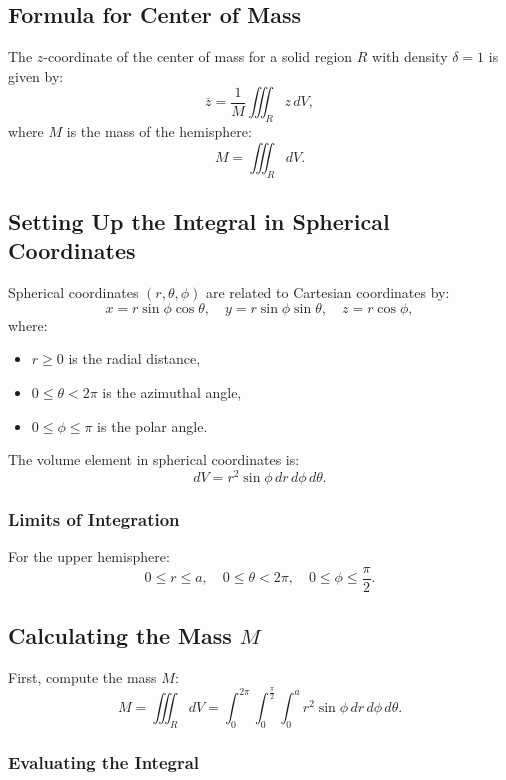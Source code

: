 \documentclass[11pt]{article}
\begin{document}
\newpage

\subsection{Formula for Center of Mass}

The \( z \)-coordinate of the center of mass for a solid region \( R \) with density \( \delta = 1 \) is given by:
\[
\overline{z} = \frac{1}{M} \iiint_{R} z \, dV,
\]
where \( M \) is the mass of the hemisphere:
\[
M = \iiint_{R} dV.
\]

\newpage

\subsection{Setting Up the Integral in Spherical Coordinates}

Spherical coordinates \((r, \theta, \phi)\) are related to Cartesian coordinates by:
\[
x = r \sin\phi \cos\theta, \quad y = r \sin\phi \sin\theta, \quad z = r \cos\phi,
\]
where:
\begin{itemize}
    \item \( r \geq 0 \) is the radial distance,
    \item \( 0 \leq \theta < 2\pi \) is the azimuthal angle,
    \item \( 0 \leq \phi \leq \pi \) is the polar angle.
\end{itemize}
The volume element in spherical coordinates is:
\[
dV = r^2 \sin\phi \, dr \, d\phi \, d\theta.
\]

\subsubsection{Limits of Integration}

For the upper hemisphere:
\[
0 \leq r \leq a, \quad 0 \leq \theta < 2\pi, \quad 0 \leq \phi \leq \frac{\pi}{2}.
\]

\newpage

\subsection{Calculating the Mass \( M \)}

First, compute the mass \( M \):
\[
M = \iiint_{R} dV = \int_{0}^{2\pi} \int_{0}^{\frac{\pi}{2}} \int_{0}^{a} r^2 \sin\phi \, dr \, d\phi \, d\theta.
\]

\subsubsection{Evaluating the Integral}
\end{document}
